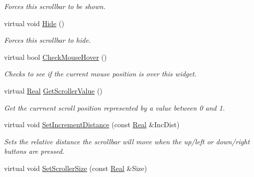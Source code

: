 \begin{DoxyCompactItemize}
\begin{DoxyCompactList}\small\item\em Forces this scrollbar to be shown. \item\end{DoxyCompactList}\item 
\hypertarget{classphys_1_1UI_1_1Scrollbar_aa0aa0d3441ec9c8162025a7e06ec773b}{
virtual void \hyperlink{classphys_1_1UI_1_1Scrollbar_aa0aa0d3441ec9c8162025a7e06ec773b}{Hide} ()}
\label{classphys_1_1UI_1_1Scrollbar_aa0aa0d3441ec9c8162025a7e06ec773b}

\begin{DoxyCompactList}\small\item\em Forces this scrollbar to hide. \item\end{DoxyCompactList}\item 
virtual bool \hyperlink{classphys_1_1UI_1_1Scrollbar_a8afdd63e36a7fdc15bd8660d9800f2c5}{CheckMouseHover} ()
\begin{DoxyCompactList}\small\item\em Checks to see if the current mouse position is over this widget. \item\end{DoxyCompactList}\item 
virtual \hyperlink{namespacephys_af7eb897198d265b8e868f45240230d5f}{Real} \hyperlink{classphys_1_1UI_1_1Scrollbar_abd70ba640ef9475a77334aa209121812}{GetScrollerValue} ()
\begin{DoxyCompactList}\small\item\em Get the currnent scroll position represented by a value between 0 and 1. \item\end{DoxyCompactList}\item 
virtual void \hyperlink{classphys_1_1UI_1_1Scrollbar_a238097181d00ac3bbff0d31d2dc0b237}{SetIncrementDistance} (const \hyperlink{namespacephys_af7eb897198d265b8e868f45240230d5f}{Real} \&IncDist)
\begin{DoxyCompactList}\small\item\em Sets the relative distance the scrollbar will move when the up/left or down/right buttons are pressed. \item\end{DoxyCompactList}\item 
virtual void \hyperlink{classphys_1_1UI_1_1Scrollbar_a4bd103fd17411e5abc6a8c731ccb9183}{SetScrollerSize} (const \hyperlink{namespacephys_af7eb897198d265b8e868f45240230d5f}{Real} \&Size)

\end{DoxyCompactItemize}
